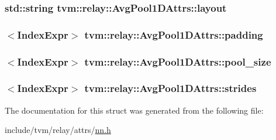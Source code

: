 \subsubsection[{\texorpdfstring{layout}{layout}}]{\setlength{\rightskip}{0pt plus 5cm}std\+::string tvm\+::relay\+::\+Avg\+Pool1\+D\+Attrs\+::layout}\hypertarget{structtvm_1_1relay_1_1AvgPool1DAttrs_ae841ee394e1455dcb61656303f0358f0}{}\label{structtvm_1_1relay_1_1AvgPool1DAttrs_ae841ee394e1455dcb61656303f0358f0}
\subsubsection[{\texorpdfstring{padding}{padding}}]{$<${\bf Index\+Expr}$>$ tvm\+::relay\+::\+Avg\+Pool1\+D\+Attrs\+::padding}\hypertarget{structtvm_1_1relay_1_1AvgPool1DAttrs_a8b1a5a871c291f50af252b0ef4e30e1f}{}\label{structtvm_1_1relay_1_1AvgPool1DAttrs_a8b1a5a871c291f50af252b0ef4e30e1f}
\subsubsection[{\texorpdfstring{pool\+\_\+size}{pool_size}}]{$<${\bf Index\+Expr}$>$ tvm\+::relay\+::\+Avg\+Pool1\+D\+Attrs\+::pool\+\_\+size}\hypertarget{structtvm_1_1relay_1_1AvgPool1DAttrs_a21d129b7f51e96d3f60277765f5def04}{}\label{structtvm_1_1relay_1_1AvgPool1DAttrs_a21d129b7f51e96d3f60277765f5def04}
\subsubsection[{\texorpdfstring{strides}{strides}}]{$<${\bf Index\+Expr}$>$ tvm\+::relay\+::\+Avg\+Pool1\+D\+Attrs\+::strides}\hypertarget{structtvm_1_1relay_1_1AvgPool1DAttrs_a07cc53b61ea1287df0fc6265b2e50c99}{}\label{structtvm_1_1relay_1_1AvgPool1DAttrs_a07cc53b61ea1287df0fc6265b2e50c99}


The documentation for this struct was generated from the following file\+:\begin{DoxyCompactItemize}
\item 
include/tvm/relay/attrs/\hyperlink{include_2tvm_2relay_2attrs_2nn_8h}{nn.\+h}\end{DoxyCompactItemize}
